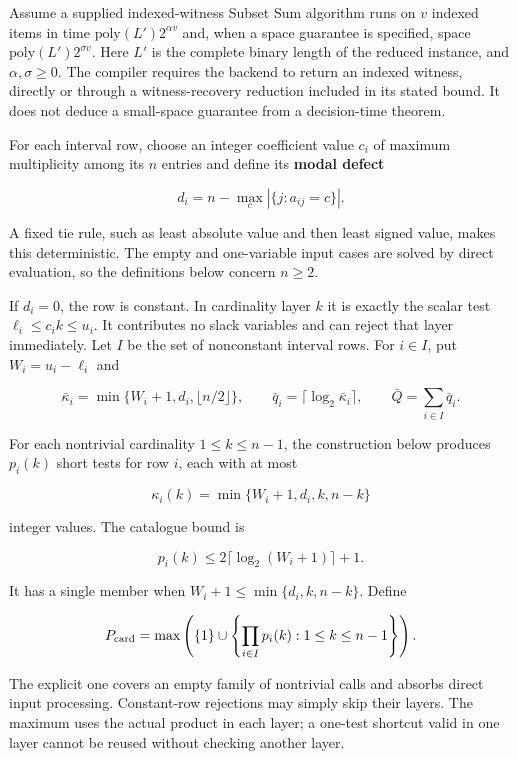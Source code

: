 Assume a supplied indexed-witness Subset Sum algorithm runs on \(v\) indexed items in time \(\mathrm{poly}(L')2^{\alpha v}\) and, when a space guarantee is specified, space \(\mathrm{poly}(L')2^{\sigma v}\). Here \(L'\) is the complete binary length of the reduced instance, and \(\alpha,\sigma\ge0\). The compiler requires the backend to return an indexed witness, directly or through a witness-recovery reduction included in its stated bound. It does not deduce a small-space guarantee from a decision-time theorem.

For each interval row, choose an integer coefficient value \(c_i\) of maximum multiplicity among its \(n\) entries and define its \textbf{modal defect}

\[
d_i=n-\max_c|\{j:a_{ij}=c\}|.
\]

A fixed tie rule, such as least absolute value and then least signed value, makes this deterministic. The empty and one-variable input cases are solved by direct evaluation, so the definitions below concern \(n\ge2\).

If \(d_i=0\), the row is constant. In cardinality layer \(k\) it is exactly the scalar test \(\ell_i\le c_i k\le u_i\). It contributes no slack variables and can reject that layer immediately. Let \(I\) be the set of nonconstant interval rows. For \(i\in I\), put \(W_i=u_i-\ell_i\) and

\[
\bar\kappa_i=\min\{W_i+1,d_i,\lfloor n/2\rfloor\},\qquad
\bar q_i=\lceil\log_2\bar\kappa_i\rceil,\qquad
\bar Q=\sum_{i\in I}\bar q_i.
\]

For each nontrivial cardinality \(1\le k\le n-1\), the construction below produces \(p_i(k)\) short tests for row \(i\), each with at most

\[
\kappa_i(k)=\min\{W_i+1,d_i,k,n-k\}
\]

integer values. The catalogue bound is

\[
p_i(k)\le2\lceil\log_2(W_i+1)\rceil+1.
\]

It has a single member when \(W_i+1\le\min\{d_i,k,n-k\}\). Define

\[
P_{\rm card}=\max\left(\{1\}\cup
 \left\{\prod_{i\in I}p_i(k):1\le k\le n-1\right\}\right).
\]

The explicit one covers an empty family of nontrivial calls and absorbs direct input processing. Constant-row rejections may simply skip their layers. The maximum uses the actual product in each layer; a one-test shortcut valid in one layer cannot be reused without checking another layer.

